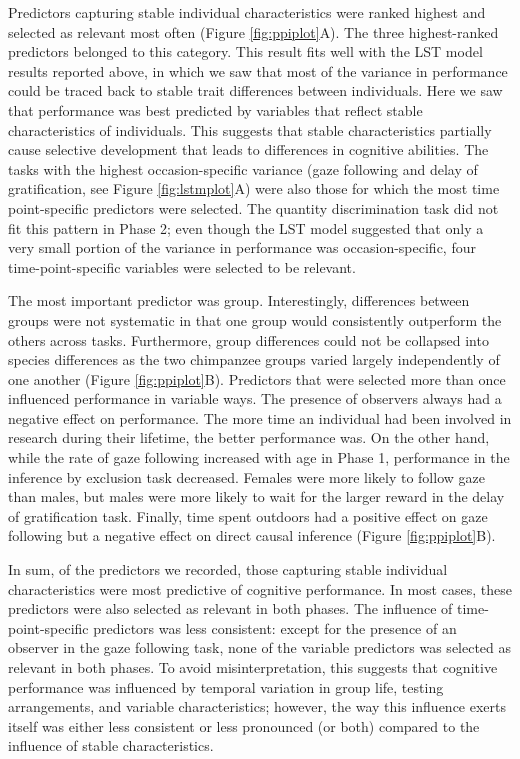 \documentclass[
  man,floatsintext]{apa6}
\begin{document}
Predictors capturing stable individual characteristics were ranked highest and selected as relevant most often (Figure \ref{fig:ppiplot}A). The three highest-ranked predictors belonged to this category. This result fits well with the LST model results reported above, in which we saw that most of the variance in performance could be traced back to stable trait differences between individuals. Here we saw that performance was best predicted by variables that reflect stable characteristics of individuals. This suggests that stable characteristics partially cause selective development that leads to differences in cognitive abilities. The tasks with the highest occasion-specific variance (gaze following and delay of gratification, see Figure \ref{fig:lstmplot}A) were also those for which the most time point-specific predictors were selected. The quantity discrimination task did not fit this pattern in Phase 2; even though the LST model suggested that only a very small portion of the variance in performance was occasion-specific, four time-point-specific variables were selected to be relevant.

The most important predictor was group. Interestingly, differences between groups were not systematic in that one group would consistently outperform the others across tasks. Furthermore, group differences could not be collapsed into species differences as the two chimpanzee groups varied largely independently of one another (Figure \ref{fig:ppiplot}B). Predictors that were selected more than once influenced performance in variable ways. The presence of observers always had a negative effect on performance. The more time an individual had been involved in research during their lifetime, the better performance was. On the other hand, while the rate of gaze following increased with age in Phase 1, performance in the inference by exclusion task decreased. Females were more likely to follow gaze than males, but males were more likely to wait for the larger reward in the delay of gratification task. Finally, time spent outdoors had a positive effect on gaze following but a negative effect on direct causal inference (Figure \ref{fig:ppiplot}B).

In sum, of the predictors we recorded, those capturing stable individual characteristics were most predictive of cognitive performance. In most cases, these predictors were also selected as relevant in both phases. The influence of time-point-specific predictors was less consistent: except for the presence of an observer in the gaze following task, none of the variable predictors was selected as relevant in both phases. To avoid misinterpretation, this suggests that cognitive performance was influenced by temporal variation in group life, testing arrangements, and variable characteristics; however, the way this influence exerts itself was either less consistent or less pronounced (or both) compared to the influence of stable characteristics.
\end{document}
